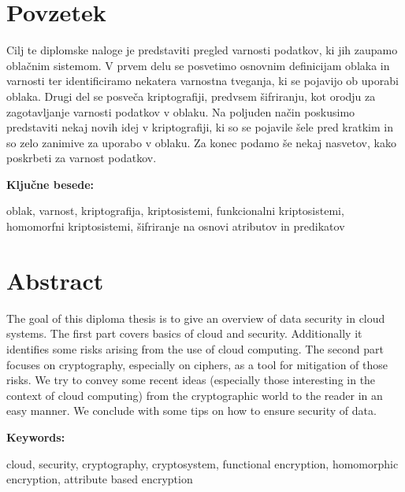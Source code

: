 \documentclass[12pt,a4paper,openany,tikz]{book}
\theoremstyle{plain}
\theoremstyle{definition}
\begin{document}
\cleardoublepage
\chapter*{Povzetek}

Cilj te diplomske naloge je predstaviti pregled varnosti podatkov, ki jih zaupamo oblačnim sistemom. V prvem delu se posvetimo osnovnim definicijam oblaka in varnosti ter identificiramo nekatera varnostna tveganja, ki se pojavijo ob uporabi oblaka. Drugi del se posveča kriptografiji, predvsem šifriranju, kot orodju za zagotavljanje varnosti podatkov v oblaku. Na poljuden način poskusimo predstaviti nekaj novih idej v kriptografiji, ki so se pojavile šele pred kratkim in so zelo zanimive za uporabo v oblaku. Za konec podamo še nekaj nasvetov, kako poskrbeti za varnost podatkov.

\vspace{1.3cm}
\noindent
{\large \bf Ključne besede:}

\vspace{0.5cm}
\noindent
oblak, varnost, kriptografija, kriptosistemi, funkcionalni kriptosistemi, homomorfni kriptosistemi, šifriranje na osnovi atributov in predikatov

\cleardoublepage
\chapter*{Abstract}

The goal of this diploma thesis is to give an overview of data security in cloud systems. The first part covers basics of cloud and security. Additionally it identifies some risks arising from the use of cloud computing. The second part focuses on cryptography, especially on ciphers, as a tool for mitigation of those risks. We try to convey some recent ideas (especially those interesting in the context of cloud computing) from the cryptographic world to the reader in an easy manner. We conclude with some tips on how to ensure security of data.

\vspace{1.3cm}
\noindent
{\large \bf Keywords:}

\vspace{0.5cm}
\noindent
cloud, security, cryptography, cryptosystem, functional encryption, homomorphic encryption, attribute based encryption


\mainmatter
\end{document}
